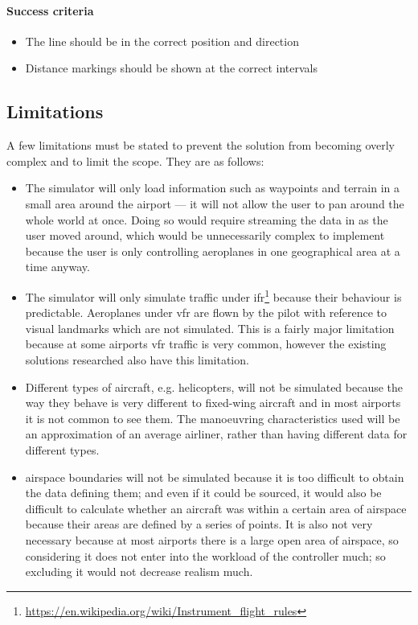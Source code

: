 \documentclass{article}
\begin{document}
\paragraph{Success criteria}
\begin{itemize}
    \item The line should be in the correct position and direction
    \item Distance markings should be shown at the correct intervals
\end{itemize}


\subsection{Limitations}
A few limitations must be stated to prevent the solution from becoming overly complex and to limit the scope.
They are as follows:
\begin{itemize}
    \item The simulator will only load information such as waypoints and terrain in a small area around the airport --- it will not allow the user to pan around the whole world at once.
    Doing so would require streaming the data in as the user moved around, which would be unnecessarily complex to implement because the user is only controlling aeroplanes in one geographical area at a time anyway.
    \item The simulator will only simulate traffic under \acrfull{ifr}\footnote{\url{https://en.wikipedia.org/wiki/Instrument_flight_rules}} because their behaviour is predictable.
    Aeroplanes under \acrfull{vfr} are flown by the pilot with reference to visual landmarks which are not simulated.
    This is a fairly major limitation because at some airports \acrshort{vfr} traffic is very common, however the existing solutions researched also have this limitation.
    \item Different types of aircraft, e.g. helicopters, will not be simulated because the way they behave is very different to fixed-wing aircraft and in most airports it is not common to see them.
    The manoeuvring characteristics used will be an approximation of an average airliner, rather than having different data for different types.
    \item \Gls{airspace} boundaries will not be simulated because it is too difficult to obtain the data defining them; and even if it could be sourced, it would also be difficult to calculate whether an aircraft was within a certain area of airspace because their areas are defined by a series of points.
    It is also not very necessary because at most airports there is a large open area of \gls{airspace}, so considering it does not enter into the workload of the controller much; so excluding it would not decrease realism much.
\end{itemize}
\end{document}

